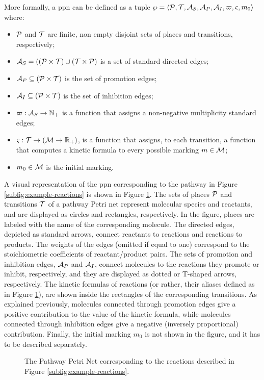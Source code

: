 More formally, a \gls{ppn} can be defined as a tuple $\wp = \Tuple{\Cal{P},\Cal{T},\Cal{A}_{S}, \Cal{A}_{P},\Cal{A}_{I},\varpi,\varsigma,m_0}$ where:
\begin{itemize}
    \item $\Cal{P}$ and $\Cal{T}$ are finite, non empty disjoint sets of places and transitions, respectively;
    \item $\Cal{A}_{S} = ((\Cal{P}\times \Cal{T}) \cup (\Cal{T}\times \Cal{P})$ is a set of standard directed edges;
    \item $\Cal{A}_{P} \subseteq (\Cal{P} \times \Cal{T})$ is the set of promotion edges;
    \item $\Cal{A}_{I} \subseteq (\Cal{P} \times \Cal{T})$ is the set of inhibition edges;
    \item $\varpi: \Cal{A}_{S} \shortrightarrow \Natural_{+}$ is a function that assigns a non-negative multiplicity standard edges;
    \item $\varsigma:\Cal{T} \shortrightarrow (\Cal{M} \rightarrow \Real_{+})$,  is a function that assigns, to each transition, a function that computes a kinetic formula to every possible marking $m \in \Cal{M}$;
    \item $m_0 \in \Cal{M}$ is the initial marking.
\end{itemize}
A visual representation of the \gls{ppn} corresponding to the pathway in Figure \ref{subfig:example-reactions} is shown in Figure \ref{subfig:pathway-petri-net}. The sets of places $\Cal{P}$ and transitions $\Cal{T}$ of a pathway Petri net represent molecular species and reactants, and are displayed as circles and rectangles, respectively. In the figure, places are labeled with the name of the corresponding molecule. The directed edges, depicted as standard arrows, connect reactants to reactions and reactions to products. The weights of the edges (omitted if equal to one) correspond to the stoichiometric coefficients of reactant/product pairs. The sets of promotion and inhibition edges, $\Cal{A}_{P}$ and $\Cal{A}_{I}$, connect molecules to the reactions they promote or inhibit, respectively, and they are displayed as dotted or T-shaped arrows, respectively. The kinetic formulas of reactions (or rather, their aliases defined as in Figure \ref{subfig:pathway-petri-net}), are shown inside the rectangles of the corresponding transitions. As explained previously, molecules connected through promotion edges give a positive contribution to the value of the kinetic formula, while molecules connected through inhibition edges give a negative (inversely proportional) contribution. Finally, the initial marking $m_0$ is not shown in the figure, and it has to be described separately.
\begin{figure}[h!]
    \centering
    \resizebox{.6\textwidth}{!}{}
    \caption{The Pathway Petri Net corresponding to the reactions described in Figure \ref{subfig:example-reactions}.}
    \label{subfig:pathway-petri-net}
\end{figure}

